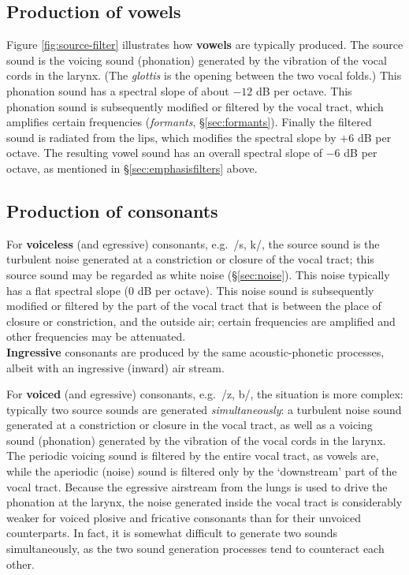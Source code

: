 \documentclass[
]{book}
\begin{document}
\subsection{Production of vowels}\label{sec:vowelproduction}

Figure \ref{fig:source-filter} illustrates how \textbf{vowels} are typically produced. The source sound is the voicing sound (phonation) generated by the vibration of the vocal cords in the larynx. (The \emph{glottis} is the opening between the two vocal folds.) This phonation sound has a spectral slope of about \(-12\) dB per octave. This phonation sound is subsequently modified or filtered by the vocal tract, which amplifies certain frequencies (\emph{formants}, §\ref{sec:formants}). Finally the filtered sound is radiated from the lips, which modifies the spectral slope by \(+6\) dB per octave. The resulting vowel sound has an overall spectral slope of \(-6\) dB per octave, as mentioned in §\ref{sec:emphasisfilters} above.

\subsection{Production of consonants}\label{production-of-consonants}

For \textbf{voiceless} (and egressive) consonants, e.g.~/s, k/, the source sound is the turbulent noise generated at a constriction or closure of the vocal tract; this source sound may be regarded as white noise (§\ref{sec:noise}). This noise typically has a flat spectral slope (\(0\) dB per octave). This noise sound is subsequently modified or filtered by the part of the vocal tract that is between the place of closure or constriction, and the outside air; certain frequencies are amplified and other frequencies may be attenuated.\\

\textbf{Ingressive} consonants are produced by the same acoustic-phonetic processes, albeit with an ingressive (inward) air stream.

For \textbf{voiced} (and egressive) consonants, e.g.~/z, b/, the situation is more complex: typically two source sounds are generated \emph{simultaneously}: a turbulent noise sound generated at a constriction or closure in the vocal tract, as well as a voicing sound (phonation) generated by the vibration of the vocal cords in the larynx. The periodic voicing sound is filtered by the entire vocal tract, as vowels are, while the aperiodic (noise) sound is filtered only by the `downstream' part of the vocal tract.
Because the egressive airstream from the lungs is used to drive the phonation at the larynx, the noise generated inside the vocal tract is considerably weaker for voiced plosive and fricative consonants than for their unvoiced counterparts. In fact, it is somewhat difficult to generate two sounds simultaneously, as the two sound generation processes tend to counteract each other.

  
\end{document}
